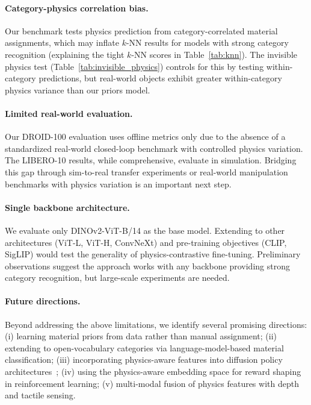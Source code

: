 \documentclass{article}
\begin{document}
\paragraph{Category-physics correlation bias.} Our benchmark tests physics prediction from category-correlated material assignments, which may inflate $k$-NN results for models with strong category recognition (explaining the tight $k$-NN scores in Table~\ref{tab:knn}). The invisible physics test (Table~\ref{tab:invisible_physics}) controls for this by testing within-category predictions, but real-world objects exhibit greater within-category physics variance than our priors model.

\paragraph{Limited real-world evaluation.} Our DROID-100 evaluation uses offline metrics only due to the absence of a standardized real-world closed-loop benchmark with controlled physics variation. The LIBERO-10 results, while comprehensive, evaluate in simulation. Bridging this gap through sim-to-real transfer experiments or real-world manipulation benchmarks with physics variation is an important next step.

\paragraph{Single backbone architecture.} We evaluate only DINOv2-ViT-B/14 as the base model. Extending to other architectures (ViT-L, ViT-H, ConvNeXt) and pre-training objectives (CLIP, SigLIP) would test the generality of physics-contrastive fine-tuning. Preliminary observations suggest the approach works with any backbone providing strong category recognition, but large-scale experiments are needed.

\paragraph{Future directions.} Beyond addressing the above limitations, we identify several promising directions: (i) learning material priors from data rather than manual assignment; (ii) extending to open-vocabulary categories via language-model-based material classification; (iii) incorporating physics-aware features into diffusion policy architectures~\cite{chi2023diffusion}; (iv) using the physics-aware embedding space for reward shaping in reinforcement learning; (v) multi-modal fusion of physics features with depth and tactile sensing.
\end{document}
